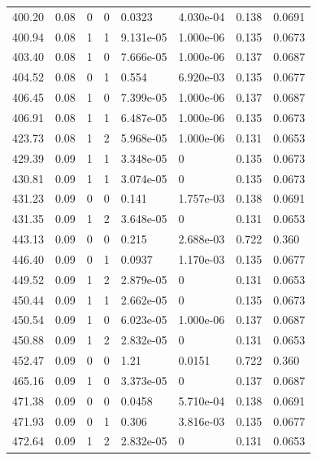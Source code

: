 \documentclass[preview]{standalone}
\begin{document}
{{{\begin{tabular}{L{1.2cm}C{1.2cm} C{0.3cm}C{0.5cm} C{1.4cm}C{1.4cm} C{1.4cm}C{1.4cm}}
  400.20  &  0.08  & 0     &  0 &  0.0323  & 4.030e-04  & 0.138 &  0.0691   \\ 
  400.94  &  0.08  & 1     &  1 &  9.131e-05  & 1.000e-06  & 0.135 &  0.0673   \\ 
  403.40  &  0.08  & 1     &  0 &  7.666e-05  & 1.000e-06  & 0.137 &  0.0687   \\ 
  404.52  &  0.08  & 0     &  1 &  0.554  & 6.920e-03  & 0.135 &  0.0677   \\ 
  406.45  &  0.08  & 1     &  0 &  7.399e-05  & 1.000e-06  & 0.137 &  0.0687   \\ 
  406.91  &  0.08  & 1     &  1 &  6.487e-05  & 1.000e-06  & 0.135 &  0.0673   \\ 
  423.73  &  0.08  & 1     &  2 &  5.968e-05  & 1.000e-06  & 0.131 &  0.0653   \\ 
  429.39  &  0.09  & 1     &  1 &  3.348e-05  & 0  & 0.135 &  0.0673   \\ 
  430.81  &  0.09  & 1     &  1 &  3.074e-05  & 0  & 0.135 &  0.0673   \\ 
  431.23  &  0.09  & 0     &  0 &  0.141  & 1.757e-03  & 0.138 &  0.0691   \\ 
  431.35  &  0.09  & 1     &  2 &  3.648e-05  & 0  & 0.131 &  0.0653   \\ 
  443.13  &  0.09  & 0     &  0 &  0.215  & 2.688e-03  & 0.722 &  0.360   \\ 
  446.40  &  0.09  & 0     &  1 &  0.0937  & 1.170e-03  & 0.135 &  0.0677   \\ 
  449.52  &  0.09  & 1     &  2 &  2.879e-05  & 0  & 0.131 &  0.0653   \\ 
  450.44  &  0.09  & 1     &  1 &  2.662e-05  & 0  & 0.135 &  0.0673   \\ 
  450.54  &  0.09  & 1     &  0 &  6.023e-05  & 1.000e-06  & 0.137 &  0.0687   \\ 
  450.88  &  0.09  & 1     &  2 &  2.832e-05  & 0  & 0.131 &  0.0653   \\ 
  452.47  &  0.09  & 0     &  0 &  1.21  & 0.0151  & 0.722 &  0.360   \\ 
  465.16  &  0.09  & 1     &  0 &  3.373e-05  & 0  & 0.137 &  0.0687   \\ 
  471.38  &  0.09  & 0     &  0 &  0.0458  & 5.710e-04  & 0.138 &  0.0691   \\ 
  471.93  &  0.09  & 0     &  1 &  0.306  & 3.816e-03  & 0.135 &  0.0677   \\ 
  472.64  &  0.09  & 1     &  2 &  2.832e-05  & 0  & 0.131 &  0.0653   \\ 

\end{tabular}}}}
\end{document}
